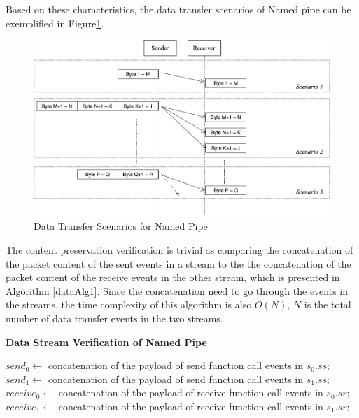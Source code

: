 Based on these characteristics, the data transfer scenarios of Named pipe can be exemplified in Figure\ref{namedpipe}. 
\begin{figure}[H]
\centerline{\includegraphics[scale=0.4]{Figures/namedpipe}}
\caption{Data Transfer Scenarios for Named Pipe}
\label{namedpipe}
\end{figure}

The content preservation verification is trivial as comparing the concatenation of the packet content of the sent events in a stream to the the concatenation of the packet content of the receive events in the other stream, which is presented in Algorithm \ref{dataAlg1}. Since the concatenation need to go through the events in the streams, the time complexity of this algorithm is also $O(N)$, $N$ is the total number of data transfer events in the two streams.

\begin{algorithm}[H]
\DontPrintSemicolon
\caption{{\bf Data Stream Verification of Named Pipe} \label{dataAlg1}}
\;
$send_0 \leftarrow$ concatenation of the payload of send function call events in $s_0.ss$;\;
$send_1 \leftarrow$ concatenation of the payload of send function call events in $s_1.ss$;\;
$receive_0 \leftarrow$ concatenation of the payload of receive function call events in $s_0.sr$;\;
$receive_1 \leftarrow$ concatenation of the payload of receive function call events in $s_1.sr$;\;
\end{algorithm} 

